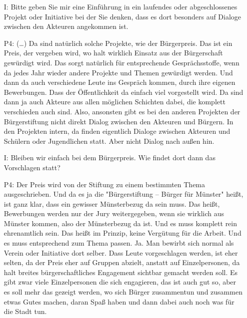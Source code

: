 \begin{itemize}
    \item[I:] Bitte geben Sie mir eine Einf{\"u}hrung in ein laufendes oder abgeschlossenes Projekt oder Initiative bei der Sie denken, dass es dort besonders auf Dialoge zwischen den Akteuren angekommen ist.
    \item[P4:] (\dots) Da sind nat{\"u}rlich solche Projekte, wie der B{\"u}rgerpreis. Das ist ein Preis, der vergeben wird, wo halt wirklich Einsatz aus der B{\"u}rgerschaft gew{\"u}rdigt wird. Das sorgt nat{\"u}rlich f{\"u}r entsprechende Gespr{\"a}chsstoffe, wenn da jedes Jahr wieder andere Projekte und Themen gew{\"u}rdigt werden. Und dann da auch verschiedene Leute ins Gespr{\"a}ch kommen, durch ihre eigenen Bewerbungen. Dass der {\"O}ffentlichkeit da einfach viel vorgestellt wird. Da sind dann ja auch Akteure aus allen m{\"o}glichen Schichten dabei, die komplett verschieden auch sind. Also, ansonsten gibt es bei den anderen Projekten der B{\"u}rgerstiftung nicht direkt Dialog zwischen den Akteuren und B{\"u}rgern. In den Projekten intern, da finden eigentlich Dialoge zwischen Akteuren und Sch{\"u}lern oder Jugendlichen statt. Aber nicht Dialog nach au{\ss}en hin.
    \item[I:] Bleiben wir einfach bei dem B{\"u}rgerpreis. Wie findet dort dann das Vorschlagen statt?
    \item[P4:] Der Preis wird von der Stiftung zu einem bestimmten Thema ausgeschrieben. Und da es ja die "B{\"u}rgerstiftung -- B{\"u}rger f{\"u}r M{\"u}nster" hei{\ss}t, ist ganz klar, dass ein gewisser M{\"u}nsterbezug da sein muss. Das hei{\ss}t, Bewerbungen werden nur der Jury weitergegeben, wenn sie wirklich aus M{\"u}nster kommen, also der M{\"u}nsterbezug da ist. Und es muss komplett rein ehrenamtlich sein. Das hei{\ss}t im Prinzip, keine Verg{\"u}tung f{\"u}r die Arbeit. Und es muss entsprechend zum Thema passen. Ja. Man bewirbt sich normal als Verein oder Initiative dort selber. Dass Leute vorgeschlagen werden, ist eher selten, da der Preis eher auf Gruppen abzielt, anstatt auf Einzelpersonen, da halt breites b{\"u}rgerschaftliches Engagement sichtbar gemacht werden soll. Es gibt zwar viele Einzelpersonen die sich engagieren, das ist auch gut so, aber es soll mehr das gezeigt werden, wo sich B{\"u}rger zusammentun und zusammen etwas Gutes machen, daran Spa{\ss} haben und dann dabei auch noch was f{\"u}r die Stadt tun.
\end{itemize}

